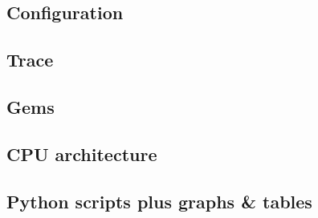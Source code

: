 \subsection{Configuration}
\label{sec:conf}

\subsection{Trace}
\label{subsec:tarce}

\subsection{Gems}
\label{subsec:gems}

\subsection{CPU architecture}
\label{sec:architecture}

\subsection{Python scripts plus graphs \& tables}
\label{sec:architecture}

